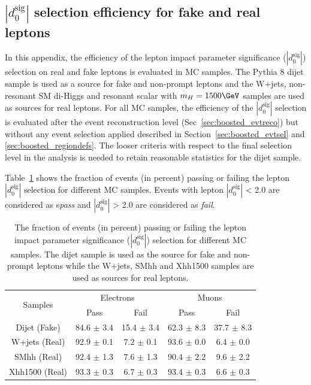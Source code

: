 \subsection{$|d_{0}^{\textrm{sig}}|$ selection efficiency for fake and real leptons}
\label{app:boosted_fakelepton_d0eff}

In this appendix, the efficiency of the lepton impact parameter significance ($|d_{0}^{\textrm{sig}}|$) selection on real and fake
leptons is evaluated in MC samples. The Pythia 8 dijet sample is used as a source for fake and non-prompt leptons and the W+jets, 
non-resonant SM di-Higgs and resonant scalar with $m_{H} = 1500 \GeV$ samples are used as sources for real leptons. 
For all MC samples, the efficiency of the $|d_{0}^{\textrm{sig}}|$ selection is evaluated after the event reconstruction level 
(Sec~\ref{sec:boosted_evtreco}) but without any event selection applied described in Section~\ref{sec:boosted_evtsel} and 
\ref{sec:boosted_regiondefs}. The looser criteria with respect to the final selection level in the analysis is needed to retain 
reasonable statistics for the dijet sample.

Table~\ref{tab:boosted_fakelepton_d0sigcuteff} shows the fraction of events (in percent) passing or failing the 
lepton $|d_{0}^{\textrm{sig}}|$ selection for different MC samples. Events with lepton $|d_{0}^{\textrm{sig}}|$ < 2.0 
are considered as s\textit{pass} and $|d_{0}^{\textrm{sig}}|$ > 2.0 are considered as \textit{fail}. 


\begin{table}[!htbp]
\begin{center}
\begin{tabular}{|c|c|c|c|c|}

\multirow{2}{*}{Samples} & \multicolumn{2}{c|}{Electrons} & \multicolumn{2}{c|}{Muons} \\
\cline{2-5}
&  Pass & Fail & Pass & Fail \\
\hline
Dijet   (Fake) &  84.6 $\pm$ 3.4 & 15.4 $\pm$ 3.4  & 62.3 $\pm$ 8.3 & 37.7 $\pm$ 8.3 \\
W+jets  (Real) &  92.9 $\pm$ 0.1 & 7.2  $\pm$ 0.1  & 93.6 $\pm$ 0.0 & 6.4  $\pm$ 0.0 \\
SMhh    (Real) &  92.4 $\pm$ 1.3 & 7.6  $\pm$ 1.3  & 90.4 $\pm$ 2.2 & 9.6  $\pm$ 2.2 \\
Xhh1500 (Real) &  93.3 $\pm$ 0.3 & 6.7  $\pm$ 0.3  & 93.4 $\pm$ 0.3 & 6.6  $\pm$ 0.3 \\
\end{tabular}
\end{center}
\caption{The fraction of events (in percent) passing or failing the lepton impact parameter 
significance ($|d_{0}^{\textrm{sig}}|$) selection for different MC samples. The dijet sample
is used as the source for fake and non-prompt leptons while the W+jets, SMhh and Xhh1500
samples are used as sources for real leptons.
} 
\label{tab:boosted_fakelepton_d0sigcuteff}
\end{table}


